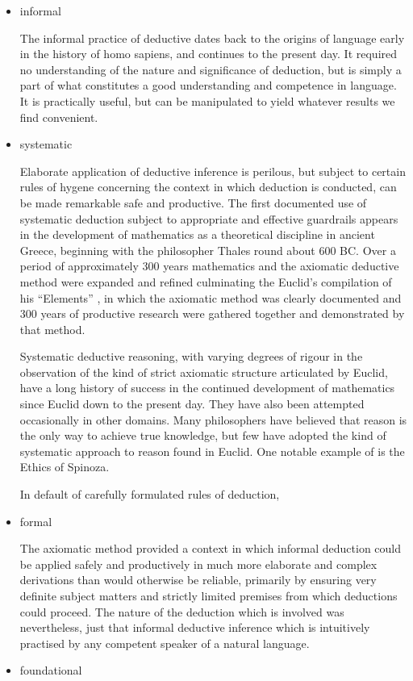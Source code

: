 \documentclass[10pt,titlepage]{book}
\begin{document}
\begin{itemize}
\item informal
  
  The informal practice of deductive dates back to the origins of language early in the history of homo sapiens, and continues to the present day.
  It required no understanding of the nature and significance of deduction, but is simply a part of what constitutes a good understanding and competence in language.
  It is practically useful, but can be manipulated to yield whatever results we find convenient.
  
\item systematic

  Elaborate application of deductive inference is perilous, but subject to certain rules of hygene concerning the context in which deduction is conducted, can be made remarkable safe and productive.
  The first documented use of systematic deduction subject to appropriate and effective guardrails appears in the development of mathematics as a theoretical discipline in ancient Greece, beginning with the philosopher Thales round about 600 BC.
  Over a period of approximately 300 years mathematics and the axiomatic deductive method were expanded and refined culminating the Euclid's compilation of his ``Elements'' \cite{euclidEL1}, in which the axiomatic method was clearly documented and 300 years of productive research were gathered together and demonstrated by that method.

  Systematic deductive reasoning, with varying degrees of rigour in the observation of the kind of strict axiomatic structure articulated by Euclid, have a long history of success in the continued development of mathematics since Euclid down to the present day.
  They have also been attempted occasionally in other domains.
  Many philosophers have believed that reason is the only way to achieve true knowledge, but few have adopted the kind of systematic approach to reason found in Euclid.
  One notable example of is the Ethics of Spinoza.

  In default of carefully formulated rules of deduction,
  
\item formal 

  The axiomatic method provided a context in which informal deduction could be applied safely and productively in much more elaborate and complex derivations than would otherwise be reliable, primarily by ensuring very definite subject matters and strictly limited premises from which deductions could proceed.
  The nature of the deduction which is involved was nevertheless, just that informal deductive inference which is intuitively practised by any competent speaker of a natural language.
  
\item foundational
  
\end{itemize}
\end{document}
